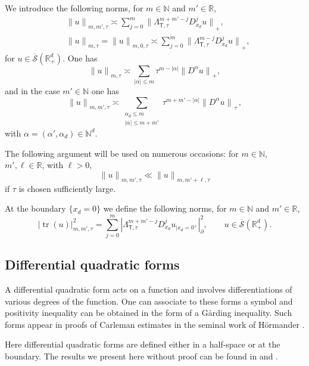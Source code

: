 \documentclass[JEP,XML,SOM,Unicode,published]{cedram}
\theoremstyle{plain}
\theoremstyle{definition}
\def\R{\mathbb{R}}
\def\N{\mathbb{N}}
\newcommand{\suff}{sufficiently\xspace}
\newcommand{\br}{\ensuremath{_{|x_d=0^+}}}
\newcommand{\Norm}[2]{{\| #1 \|}_{#2}}
\newcommand{\norm}[2]{{|#1|}_{#2}}
\newcommand{\Normsc}[2]{{\| #1 \|}_{#2, \tau}}
\newcommand{\normsc}[2]{{| #1 |}_{#2, \tau}}
\newcommand{\Lsct}{\Lambda_{{\scriptscriptstyle{\mathsf T}},\tau}}
\newcommand{\Sbarp}{\ensuremath{\overline{\mathscr{S}}(\Rdp)}}
\newcommand{\Rdp}{\R^d_+}
\DeclareMathOperator{\trace}{tr}
\begin{document}
We introduce the following norms, for $m\in\N$ and $m'\in\R$,
\begin{align*}
& \Normsc{u}{m,m'}
\asymp \sum_{j=0}^{m}
\Norm{\Lsct^{m+m'-j} D_{x_d}^j u}{+},\\
& \Normsc{u}{m}
=\Normsc{u}{m,0}
\asymp\sum_{j=0}^{m}
\Norm{\Lsct^{m-j} D_{x_d}^j u}{+},
\end{align*}
for $u\in\Sbarp$. One has
\begin{equation*}
\Normsc{u}{m}
\asymp
\sum_{|\alpha|\leq m}\tau^{m-|\alpha|}
\Norm{D^{\alpha}u}{+},
\end{equation*}
and in the case $m'\in\N$ one has
\begin{equation*}
\Normsc{u}{m,m'}
\asymp\sum_{\substack{\alpha_d\leq m\\ |\alpha|\leq m+m'}}
\tau^{m+m'-|\alpha|}
\Norm{D^{\alpha}u}{+},
\end{equation*}
with $\alpha=(\alpha',\alpha_d)\in\N^d$.

The following argument will be used on numerous occasions: for $m\in\N$, $m',\ell\in\R$, with $\ell>0$,
\begin{equation*}
\Normsc{u}{m,m'}
\ll \Normsc{u}{m,m'+\ell}
\end{equation*}
if $\tau $ is chosen
\suff large.

At the boundary $\{x_d=0\}$ we define the following norms, for $m\in\N$ and $m'\in\R$,
\begin{equation*}
\normsc{\trace(u)}{m,m'}^2
=\sum_{j=0}^{m}
\norm{\Lsct^{m+m'-j} D^j_{x_d}u\br}{\partial}^2,
\qquad u\in\Sbarp.
\end{equation*}

\subsection{Differential quadratic forms}
\label{sec: Differential quadratic forms}

A differential quadratic form acts on a function and involves
differentiations of various degrees of the function. One can associate
to these forms a symbol and positivity inequality can be obtained in
the form of a G{\aa}rding inequality.
Such forms appear in proofs of Carleman estimates in the seminal work
of Hörmander \cite[\S 8.2]{Hoermander:63}.

Here differential quadratic forms are
defined either in a half-space or at the boundary. The results we
present here without proof can be found in \cite{ML} and \cite{JGL-vol2}.

\end{document}
